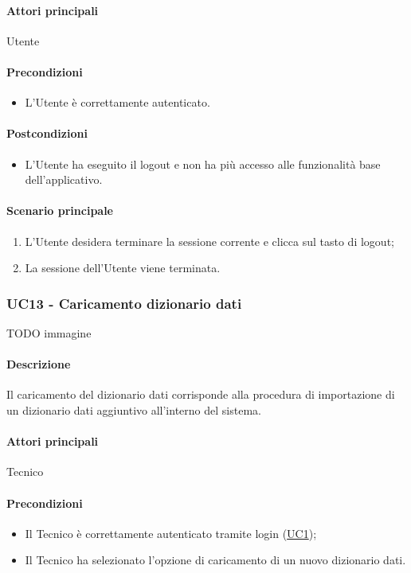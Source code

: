 \paragraph*{Attori principali} Utente

\paragraph*{Precondizioni}
\begin{itemize}
  \item L’Utente è correttamente autenticato.
\end{itemize}

\paragraph*{Postcondizioni}
\begin{itemize}
  \item L’Utente ha eseguito il logout e non ha più accesso alle funzionalità base dell’applicativo.
\end{itemize}

\paragraph*{Scenario principale}
\begin{enumerate}
  \item L’Utente desidera terminare la sessione corrente e clicca sul tasto di logout;
  \item La sessione dell’Utente viene terminata.  
\end{enumerate}


\subsubsection{UC13 - Caricamento dizionario dati}\label{UC13}
TODO immagine\paragraph*{Descrizione} Il caricamento del dizionario dati corrisponde alla procedura di importazione di un dizionario dati aggiuntivo all’interno del sistema.

\paragraph*{Attori principali} Tecnico

\paragraph*{Precondizioni}
\begin{itemize}
  \item Il Tecnico è correttamente autenticato tramite login (\hyperref[UC1]{UC1});
  \item Il Tecnico ha selezionato l’opzione di caricamento di un nuovo dizionario dati.  
\end{itemize}

